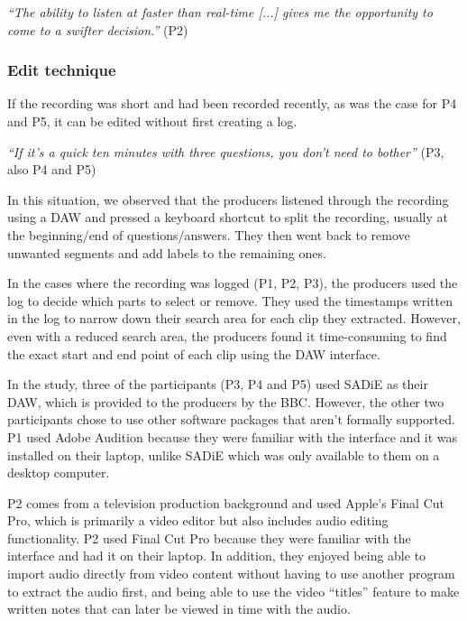 \textit{``The ability to listen at faster than real-time [...] gives me the opportunity to come to a swifter decision.''}
(P2)


\subsubsection{Edit technique}

If the recording was short and had been recorded recently, as was the case for P4 and P5, it can be edited
without first creating a log.

\textit{``If it's a quick ten minutes with three questions, you don't need to bother''} (P3, also P4 and P5)

In this situation, we observed that the producers listened through the recording using a
DAW and pressed a keyboard shortcut to split the recording, usually at the beginning/end of questions/answers. They
then went back to remove unwanted segments and add labels to the remaining ones.

In the cases where the recording was logged (P1, P2, P3), the producers used the log to decide which parts to select or
remove. They used the timestamps written in the log to narrow down their search area for each clip they extracted.
However, even with a reduced search area, the producers found it time-consuming to find the exact start and end point
of each clip using the DAW interface.

In the study, three of the participants (P3, P4 and P5) used SADiE as their DAW, which is provided to the producers by
the BBC. However, the other two participants chose to use other software packages that aren't formally supported. P1
used Adobe Audition because they were familiar with the interface and it was installed on their laptop, unlike SADiE
which was only available to them on a desktop computer.

P2 comes from a television production background and used Apple's Final Cut Pro, which is primarily a video editor but
also includes audio editing functionality.  P2 used Final Cut Pro because they were familiar with the interface and had
it on their laptop. In addition, they enjoyed being able to import audio directly from video content without having to
use another program to extract the audio first, and being able to use the video ``titles'' feature to make written notes
that can later be viewed in time with the audio.

